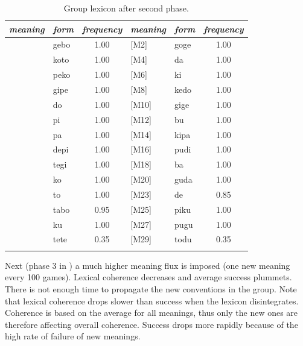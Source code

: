 \begin{table}
\begin{center}
\begin{tabular}{ l  l  c  l  l  c } \midrule 
{\it meaning} & {\it form} & {\it frequency} & {\it meaning} & {\it form} & {\it frequency}\\ \midrule 
[M1]& gebo & 1.00 & [M2]& goge & 1.00 \\ \midrule 
[M3]& koto & 1.00 & [M4]& da & 1.00 \\ \midrule 
[M5]& peko & 1.00 & [M6]& ki & 1.00 \\ \midrule 
[M7]& gipe & 1.00 & [M8]& kedo & 1.00 \\ \midrule 
[M9]& do & 1.00 & [M10]& gige & 1.00 \\ \midrule 
[M11]& pi & 1.00 & [M12]& bu & 1.00 \\ \midrule 
[M13]& pa & 1.00 & [M14]& kipa & 1.00 \\ \midrule 
[M15]& depi & 1.00 & [M16]& pudi & 1.00 \\ \midrule 
[M17]& tegi & 1.00 & [M18]& ba & 1.00 \\ \midrule 
[M19]& ko & 1.00 & [M20]& guda & 1.00 \\ \midrule 
[M22]& to & 1.00 & [M23]& de & 0.85 \\ \midrule 
[M24]& tabo & 0.95 & [M25]& piku & 1.00 \\ \midrule 
[M26]& ku & 1.00 & [M27]& pugu & 1.00 \\ \midrule 
[M28]& tete & 0.35 & [M29]& todu & 0.35 \\ \midrule 
\lspbottomrule
\end{tabular}
\caption{\label{tab:phase1} Group lexicon after second phase.}
\end{center}
\end{table}
Next (phase 3 in ) a much higher 
meaning flux is imposed (one new meaning every 100 games). 
Lexical coherence decreases and
average success plummets. There is not enough time to propagate
the new conventions in the group. 
Note that lexical coherence drops slower than 
success when the lexicon disintegrates. 
Coherence is based on the average for all 
meanings, thus only the new ones are therefore affecting overall coherence. 
Success drops more rapidly 
because of the high rate of failure of new meanings. 

